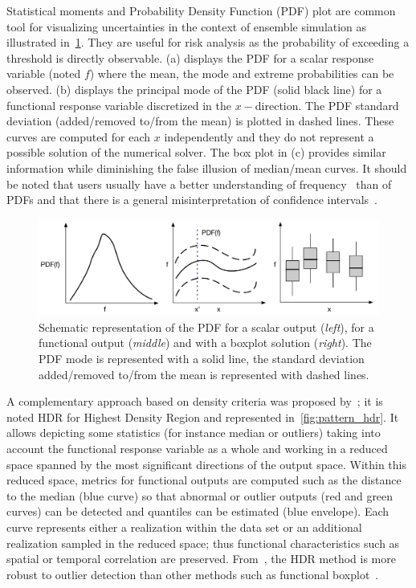 Statistical moments and Probability Density Function (PDF) plot are common tool for visualizing uncertainties in the context of ensemble simulation as illustrated in~\cref{fig:pattern_pdf}. They are useful for risk analysis as the probability of exceeding a threshold is directly observable. (a) displays the PDF for a scalar response variable (noted $f$) where the mean, the mode and extreme probabilities can be observed. (b) displays the principal mode of the PDF (solid black line) for a functional response variable discretized in the $x-$direction. The PDF standard deviation (added/removed to/from the mean) is plotted in dashed lines. These curves are computed for each $x$ independently and they do not represent a possible solution of the numerical solver. The box plot in (c) provides similar information while diminishing the false illusion of median/mean curves. It should be noted that users usually have a better understanding of frequency~\citep{Gigerenzer1995} than of PDFs and that there is a  general misinterpretation of confidence intervals~\citep{Belia2005}.
\begin{figure}[!ht]
\centering
\includegraphics[width=\linewidth,keepaspectratio]{fig/literature/patterns_pdf.pdf}
\caption{Schematic representation of the PDF for a scalar output (\emph{left}), for a functional output (\emph{middle}) and with a boxplot solution (\emph{right}). The PDF mode is represented with a solid line, the standard deviation added/removed to/from the mean is represented with dashed lines.}
\label{fig:pattern_pdf}
\end{figure}

A complementary approach based on density criteria was proposed by~\citep{Hyndman2009,Sun2011}; it is noted HDR for Highest Density Region and represented in~\cref{fig:pattern_hdr}. It allows depicting some statistics (for instance median or outliers) taking into account the functional response variable as a whole and working in a reduced space spanned by the most significant directions of the output space. Within this reduced space, metrics for functional outputs are computed such as the distance to the median (blue curve) so that abnormal or outlier outputs (red and green curves) can be detected and quantiles can be estimated (blue envelope). Each curve represents either a realization within the data set or an additional realization sampled in the reduced space; thus functional characteristics such as spatial or temporal correlation are preserved.  From~\citep{Popelin2013,Ribes2015}, the HDR method is more robust to outlier detection than other methods such as functional boxplot~\citep{Sun2011,Whitaker2013}.

